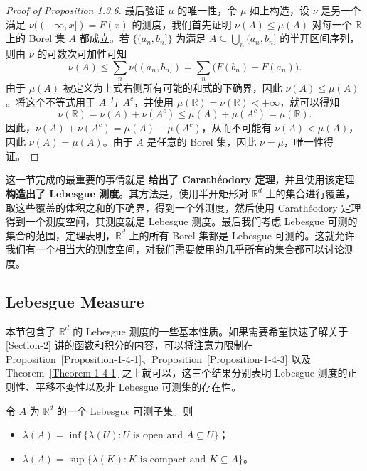 \documentclass[11pt]{article}
\newcommand{\RR}{\mathbb{R}}
\begin{document}
\begin{proof}[Proof of Proposition 1.3.6]
    最后验证 $\mu$ 的唯一性，令 $\mu$ 如上构造，设 $\nu$ 是另一个满足 $\nu((-\infty,x]) = F(x)$ 的测度，我们首先证明 $\nu(A) \le \mu(A)$ 对每一个 $\RR$ 上的 Borel 集 $A$ 都成立。若 $\{(a_n,b_n]\}$ 为满足 $A \subseteq \bigcup_n (a_n,b_n]$ 的半开区间序列，则由 $\nu$ 的可数次可加性可知
    \[
        \nu(A) \le \sum_n \nu((a_n,b_n]) = \sum_n \bigl(F(b_n)-F(a_n)\bigr).
    \]
    由于 $\mu(A)$ 被定义为上式右侧所有可能的和式的下确界，因此 $\nu(A) \le \mu(A)$。将这个不等式用于 $A$ 与 $A^c$，并使用 $\mu(\RR)=\nu(\RR)<+\infty$，就可以得知
    \[
        \nu(\RR) = \nu(A) + \nu(A^c) \le \mu(A) + \mu(A^c) = \mu(\RR).
    \]
    因此，$\nu(A)+\nu(A^c)=\mu(A)+\mu(A^c)$，从而不可能有 $\nu(A) < \mu(A)$，因此 $\nu(A)=\mu(A)$。由于 $A$ 是任意的 Borel 集，因此 $\nu=\mu$，唯一性得证。
\end{proof}

这一节完成的最重要的事情就是 {\normalfont\bfseries 给出了 Carath\'eodory 定理}，并且使用该定理 {\normalfont\bfseries 构造出了 Lebesgue 测度}。其方法是，使用半开矩形对 $\RR^d$ 上的集合进行覆盖，取这些覆盖的体积之和的下确界，得到一个外测度，然后使用 Carath\'eodory 定理得到一个测度空间，其测度就是 Lebesgue 测度。最后我们考虑 Lebesgue 可测的集合的范围，定理表明，$\RR^d$ 上的所有 Borel 集都是 Lebesgue 可测的。这就允许我们有一个相当大的测度空间，对我们需要使用的几乎所有的集合都可以讨论测度。

\clearpage

\subsection{Lebesgue Measure}\label{Section-1-4}

本节包含了 $\RR^d$ 的 Lebesgue 测度的一些基本性质。如果需要希望快速了解关于 \ref{Section-2} 讲的函数和积分的内容，可以将注意力限制在 Proposition~\ref{Proposition-1-4-1}、Proposition~\ref{Proposition-1-4-3} 以及 Theorem~\ref{Theorem-1-4-1} 之上就可以，这三个结果分别表明 Lebesgue 测度的正则性、平移不变性以及非 Lebesgue 可测集的存在性。

\begin{proposition}\label{Proposition-1-4-1}
    令 $A$ 为 $\RR^d$ 的一个 Lebesgue 可测子集。则
    \begin{itemize}
        \item $\lambda(A) = \inf\{\lambda(U) : U \text{ is open and } A \subseteq U\}$；
        \item $\lambda(A) = \sup\{\lambda(K) : K \text{ is compact and } K \subseteq A\}$。
    \end{itemize}
\end{proposition}
\end{document}
